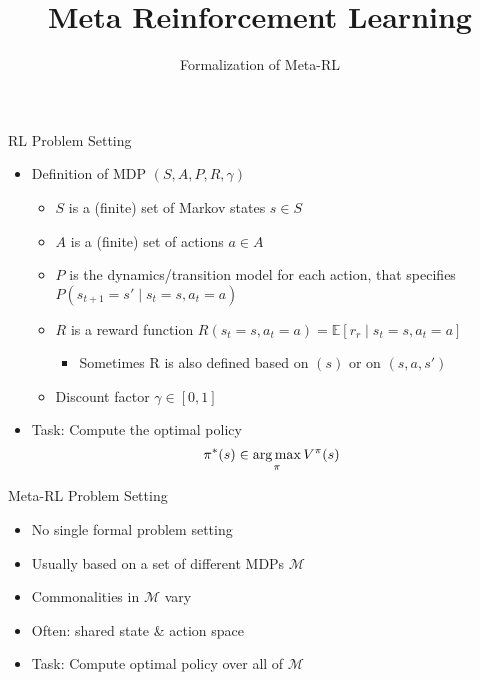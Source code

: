 \documentclass[aspectratio=169]{../latex_main/tntbeamer}  %
\title[Meta-RL]{Meta Reinforcement Learning}
\subtitle{Formalization of Meta-RL}
\begin{document}
	
	\maketitle

\begin{frame}[c]{RL Problem Setting}

\begin{itemize}
	\item Definition of MDP $(S,A,P, R, \gamma)$
	\begin{itemize}
		\item $S$ is a (finite) set of Markov states $s \in S$
		\item $A$ is a (finite) set of actions $a \in A$
		\item $P$ is the dynamics/transition model for each action, that specifies $P(s_{t+1} = s' \mid s_t=s, a_t=a)$
		\item $R$ is a reward function 
		$R(s_t=s, a_t=a) = \mathbb{E}[r_r \mid s_t=s, a_t=a] $
		\begin{itemize}
			\item Sometimes R is also defined based on $(s)$ or on $(s,a,s')$
		\end{itemize}
		\item Discount factor $\gamma \in [0, 1]$
	\end{itemize}
	\bigskip
	\item Task: Compute the optimal policy
		$$ \pi^*(s)  \in \operatorname*{arg\,max}_\pi V^\pi(s)$$
\end{itemize}


\end{frame}
\begin{frame}[c]{Meta-RL Problem Setting}
	
\begin{itemize}
	\item No single formal problem setting
	\item Usually based on a set of different MDPs $\mathcal{M}$ 
	\item Commonalities in $\mathcal{M}$ vary
	\item Often: shared state \& action space
	\item Task: Compute optimal policy over all of $\mathcal{M}$
\end{itemize}
	
\end{frame}
\end{document}
